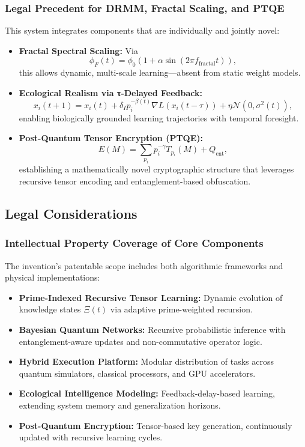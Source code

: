 \documentclass{article}
\theoremstyle{plain}
\theoremstyle{claimstyle}
\begin{document}
\subsubsection{Legal Precedent for DRMM, Fractal Scaling, and PTQE}

This system integrates components that are individually and jointly novel:
\begin{itemize}
    \item \textbf{Fractal Spectral Scaling:} Via
    \[
    \phi_F(t) = \phi_0 (1 + \alpha \sin(2\pi f_{\text{fractal}} t)),
    \]
    this allows dynamic, multi-scale learning—absent from static weight models.
    
    \item \textbf{Ecological Realism via τ-Delayed Feedback:}
    \[
    x_i(t+1) = x_i(t) + \delta_I p_i^{-\beta(t)} \nabla L(x_i(t - \tau)) + \eta \mathcal{N}(0, \sigma^2(t)),
    \]
    enabling biologically grounded learning trajectories with temporal foresight.
    
    \item \textbf{Post-Quantum Tensor Encryption (PTQE):}
    \[
    E(M) = \sum_{p_i} p_i^{-\gamma} T_{p_i}(M) + Q_{\text{ent}},
    \]
    establishing a mathematically novel cryptographic structure that leverages recursive tensor encoding and entanglement-based obfuscation.
\end{itemize}

\subsection{Legal Considerations}

\subsubsection{Intellectual Property Coverage of Core Components}

The invention’s patentable scope includes both algorithmic frameworks and physical implementations:
\begin{itemize}
    \item \textbf{Prime-Indexed Recursive Tensor Learning:} Dynamic evolution of knowledge states $\Xi(t)$ via adaptive prime-weighted recursion.
    \item \textbf{Bayesian Quantum Networks:} Recursive probabilistic inference with entanglement-aware updates and non-commutative operator logic.
    \item \textbf{Hybrid Execution Platform:} Modular distribution of tasks across quantum simulators, classical processors, and GPU accelerators.
    \item \textbf{Ecological Intelligence Modeling:} Feedback-delay-based learning, extending system memory and generalization horizons.
    \item \textbf{Post-Quantum Encryption:} Tensor-based key generation, continuously updated with recursive learning cycles.
\end{itemize}
\end{document}
